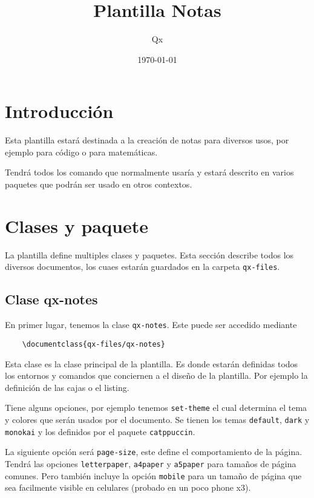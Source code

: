 \documentclass[theme=mocha, pagecolor=true, pagesize=mobile]{qx-files/qx-notes}
\title{Plantilla Notas}
\author{Qx}
\date{\today}
\begin{document}
  \maketitle



  \section{Introducción}

  Esta plantilla estará destinada a la creación de notas para diversos usos, por ejemplo para código o para matemáticas.

  Tendrá todos los comando que normalmente usaría y estará descrito en varios paquetes que podrán ser usado en otros contextos.



  \section{Clases y paquete}

  La plantilla define multiples clases y paquetes. Esta sección describe todos los diversos documentos, los cuaes estarán guardados en la carpeta \verb|qx-files|.



  \subsection{Clase qx-notes}

  En primer lugar, tenemos la clase \verb|qx-notes|. Este puede ser accedido mediante
  \begin{verbatim}
    \documentclass{qx-files/qx-notes}
  \end{verbatim}

  Esta clase es la clase principal de la plantilla. Es donde estarán definidas todos los entornos y comandos que conciernen a el diseño de la plantilla. Por ejemplo la definición de las cajas o el listing.

  Tiene alguns opciones, por ejemplo tenemos \verb|set-theme| el cual determina el tema y colores que serán usados por el documento. Se tienen los temas \verb|default|, \verb|dark| y \verb|monokai| y los definidos por el paquete \verb|catppuccin|.

  La siguiente opción será \verb|page-size|, este define el comportamiento de la página. Tendrá las opciones \verb|letterpaper|, \verb|a4paper| y \verb|a5paper| para tamaños de página comunes. Pero también incluye la opción \verb|mobile| para un tamaño de página que sea facilmente visible en celulares (probado en un poco phone x3).
\end{document}
